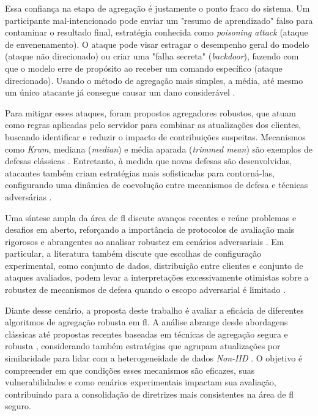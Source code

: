 Essa confiança na etapa de agregação é justamente o ponto fraco do sistema. Um participante mal-intencionado pode enviar um "resumo de aprendizado" falso para contaminar o resultado final, estratégia conhecida como \textit{poisoning attack} (ataque de envenenamento). O ataque pode visar estragar o desempenho geral do modelo (ataque não direcionado) ou criar uma "falha secreta" (\textit{backdoor}), fazendo com que o modelo erre de propósito ao receber um comando específico (ataque direcionado). Usando o método de agregação mais simples, a média, até mesmo um único atacante já consegue causar um dano considerável \cite{Sikandar2023}.

Para mitigar esses ataques, foram propostos agregadores robustos, que atuam como regras aplicadas pelo servidor para combinar as atualizações dos clientes, buscando identificar e reduzir o impacto de contribuições suspeitas. Mecanismos como \textit{Krum}, mediana (\textit{median}) e média aparada (\textit{trimmed mean}) são exemplos de defesas clássicas \cite{Zhang2025}. Entretanto, à medida que novas defesas são desenvolvidas, atacantes também criam estratégias mais sofisticadas para contorná-las, configurando uma dinâmica de coevolução entre mecanismos de defesa e técnicas adversárias \cite{Sikandar2023}.

Uma síntese ampla da área de \gls{fl} discute avanços recentes e reúne problemas e desafios em aberto, reforçando a importância de protocolos de avaliação mais rigorosos e abrangentes ao analisar robustez em cenários adversariais \cite{Kairouz2021}. Em particular, a literatura também discute que escolhas de configuração experimental, como conjunto de dados, distribuição entre clientes e conjunto de ataques avaliados, podem levar a interpretações excessivamente otimistas sobre a robustez de mecanismos de defesa quando o escopo adversarial é limitado \cite{Kairouz2021,Khan2023,Lyu2020}.

Diante desse cenário, a proposta deste trabalho é avaliar a eficácia de diferentes algoritmos de agregação robusta em \gls{fl}. A análise abrange desde abordagens clássicas até propostas recentes baseadas em técnicas de agregação segura e robusta \cite{Zhang2025}, considerando também estratégias que agrupam atualizações por similaridade para lidar com a heterogeneidade de dados \textit{Non-IID} \cite{Zhao2018}. O objetivo é compreender em que condições esses mecanismos são eficazes, suas vulnerabilidades e como cenários experimentais impactam sua avaliação, contribuindo para a consolidação de diretrizes mais consistentes na área de \gls{fl} seguro.
